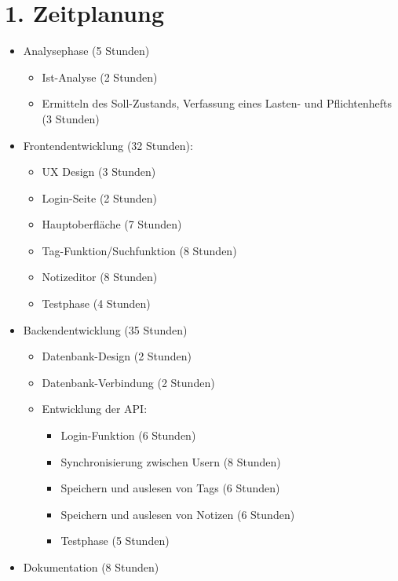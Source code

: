 \section*{1. Zeitplanung}
\label{zeitplanung}
    \begin{itemize}
        \item Analysephase (5 Stunden)
            \begin{itemize}
                \item Ist-Analyse (2 Stunden)
                \item Ermitteln des Soll-Zustands, Verfassung eines Lasten- und Pflichtenhefts (3 Stunden)
            \end{itemize}
        \item Frontendentwicklung (32 Stunden):
            \begin{itemize}
                \item UX Design (3 Stunden)
                \item Login-Seite (2 Stunden)
                \item Hauptoberfläche (7 Stunden)
                \item Tag-Funktion/Suchfunktion (8 Stunden)
                \item Notizeditor (8 Stunden)
                \item Testphase (4 Stunden)
            \end{itemize}
        \item Backendentwicklung (35 Stunden)
            \begin{itemize}
                \item Datenbank-Design (2 Stunden)
                \item Datenbank-Verbindung (2 Stunden)
                \item Entwicklung der API:
                \begin{itemize}
                    \item Login-Funktion (6 Stunden)
                    \item Synchronisierung zwischen Usern (8 Stunden)
                    \item Speichern und auslesen von Tags (6 Stunden)
                    \item Speichern und auslesen von Notizen (6 Stunden)
                    \item Testphase (5 Stunden)
                \end{itemize}
            \end{itemize}
        \item Dokumentation (8 Stunden)
    \end{itemize}

